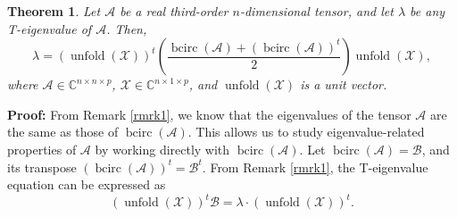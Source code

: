 \documentclass[oupthm]{CUP-JNL-BCM}%
\theoremstyle{oupplain}
\newtheorem{theorem}{Theorem}[section]
\theoremstyle{oupdefinition}
\theoremstyle{oupremark}
\theoremstyle{oupproof}
\numberwithin{equation}{section}
\begin{document}


\begin{theorem}
Let $\mathcal{A}$ be a real third-order $n$-dimensional tensor, and let $\lambda$ be any T-eigenvalue of $\mathcal{A}$. Then,
\begin{equation}  
\lambda = (\operatorname{unfold}(\mathcal{X}))^t \left(\frac{\operatorname{bcirc}(\mathcal{A}) + (\operatorname{bcirc}(\mathcal{A}))^t}{2}\right) \operatorname{unfold}(\mathcal{X}),
\end{equation}  
where $\mathcal{A} \in \mathbb{C}^{n \times n \times p}$, $\mathcal{X} \in \mathbb{C}^{n \times 1 \times p}$, and $\operatorname{unfold}(\mathcal{X})$ is a unit vector.
\end{theorem}

\noindent \textbf{Proof:} From Remark \ref{rmrk1}, we know that the eigenvalues of the tensor $\mathcal{A}$ are the same as those of $\operatorname{bcirc}(\mathcal{A})$. This allows us to study eigenvalue-related properties of $\mathcal{A}$ by working directly with $\operatorname{bcirc}(\mathcal{A})$. Let $\operatorname{bcirc}(\mathcal{A}) = \mathcal{B}$, and its transpose $(\operatorname{bcirc}(\mathcal{A}))^t = \mathcal{B}^t$. From Remark \ref{rmrk1}, the T-eigenvalue equation can be expressed as
\begin{equation}  
(\operatorname{unfold}(\mathcal{X}))^t \mathcal{B} = \lambda \cdot (\operatorname{unfold}(\mathcal{X}))^t.  
\end{equation}  
\end{document}
